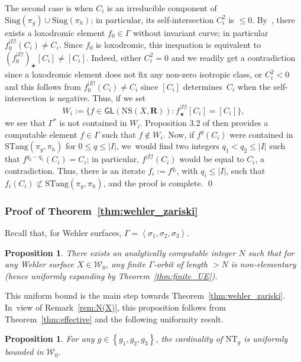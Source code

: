 \documentclass[JEP,XML,SOM,Unicode,published]{cedram}
\let\sep :
\newcommand{\set}[1]{\left\{#1\right\}}
\newcommand{\bset}[1]{\bigl\{#1\bigr\}}
\newcommand{\abs}[1]{\left\vert#1\right\vert}
\newcommand{\bra}[1]{\left\langle #1\right\rangle}
\def\R{\mathbf{R}}
\newcommand{\cW}{\mathcal{W}}
\newcommand{\NS}{{\mathrm{NS}}}
\newcommand{\Sing}{{\mathrm{Sing}}}
\newcommand{\STang}{{\mathrm{STang}}}
\newcommand{\NT}{{\mathrm{NT}}}
\newcommand\GL{{\mathsf{GL}}}
\theoremstyle{plain}
\newtheorem{pro}[thm]{Proposition}
\theoremstyle{definition}
\begin{document}
The second case is when $C_i$ is an irreducible component of $\Sing(\pi_g)\cup\Sing(\pi_h)$;
in particular, its self-intersection $C_i^2$ is $\leq 0$.
By~\cite[Th.\,D]{finite_orbits}, there exists a loxodromic element $f_0\in \Gamma$
without invariant curve; in particular $f_0^{\abs{I}!}(C_i) \neq C_i$. Since $f_0$ is loxodromic, this inequation is equivalent to
$(f_0^{\abs{I}!})_\varstar [C_i] \neq [C_i]$. Indeed, either $C_i^2=0$ and we readily get a contradiction
since a loxodromic element does not fix any non-zero isotropic class, or $C_i^2<0$
and this follows from $f_0^{\abs{I}!}(C_i) \neq C_i$ since
$[C_i]$ determines~$C_i$ when the self-intersection is negative.
Thus, if we set
\begin{equation*}
W_i:=\bset{f\in \GL(\NS(X, \R))\sep f^{\abs{I}!}_\varstar [C_i] = [C_i]},
\end{equation*}
we see that $\Gamma^*$ is not contained in $W_i$. Proposition 3.2 of \cite{eskin-mozes-oh} then provides a computable element $f\in \Gamma$
such that $f\notin W_i$. Now, if $f^q(C_i)$ were contained in $\STang(\pi_g, \pi_h)$ for $0\leq q\leq \vert I\vert$, we~would find two integers $q_1< q_2\leq \vert I\vert$ such that $f^{q_2-q_1}(C_i)=C_i$; in particular, $f^{\vert I\vert !}(C_i)$ would be equal to $C_i$, a contradiction. Thus, there is an iterate $f_i:=f^{q_i}$, with $q_i \leq \vert I\vert$, such that $f_i(C_i)\not \subset \STang(\pi_g, \pi_h)$, and the proof is complete.
\qed

\subsubsection{Proof of Theorem~\ref{thm:wehler_zariski} }\label{par:proof_of_9.3}
Recall that, for Wehler surfaces, $\Gamma = \bra{\sigma_1, \sigma_2, \sigma_3}$.

\begin{pro}\label{pro:N(X)_bounded}
There exists an analytically computable integer $N$ such that for
any Wehler surface $X\in { \cW}_0$, any
finite $\Gamma$-orbit of length $>N$ is non-elementary (hence uniformly expanding by Theorem~\ref{thm:finite_UE}).
\end{pro}

This uniform bound is the main step towards Theorem~\ref{thm:wehler_zariski}. In~view of Remark~\ref{rem:N(X)}, this proposition
follows from Theorem~\ref{thm:effective} and the following uniformity result.

\begin{pro}\label{pro:NT_bounded}
For any $g\in \set{g_1, g_2, g_3}$, the cardinality of $\NT_g$ is uniformly bounded
in $\cW_0$.
\end{pro}
\end{document}
